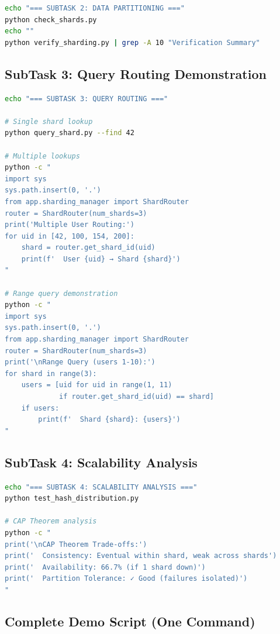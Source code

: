 \documentclass[11pt,a4paper]{article}
\begin{document}
\begin{lstlisting}[language=bash]
echo "=== SUBTASK 2: DATA PARTITIONING ==="
python check_shards.py
echo ""
python verify_sharding.py | grep -A 10 "Verification Summary"
\end{lstlisting}

\subsection*{SubTask 3: Query Routing Demonstration}

\begin{lstlisting}[language=bash]
echo "=== SUBTASK 3: QUERY ROUTING ==="

# Single shard lookup
python query_shard.py --find 42

# Multiple lookups
python -c "
import sys
sys.path.insert(0, '.')
from app.sharding_manager import ShardRouter
router = ShardRouter(num_shards=3)
print('Multiple User Routing:')
for uid in [42, 100, 154, 200]:
    shard = router.get_shard_id(uid)
    print(f'  User {uid} → Shard {shard}')
"

# Range query demonstration
python -c "
import sys
sys.path.insert(0, '.')
from app.sharding_manager import ShardRouter
router = ShardRouter(num_shards=3)
print('\nRange Query (users 1-10):')
for shard in range(3):
    users = [uid for uid in range(1, 11) 
             if router.get_shard_id(uid) == shard]
    if users:
        print(f'  Shard {shard}: {users}')
"
\end{lstlisting}

\subsection*{SubTask 4: Scalability Analysis}

\begin{lstlisting}[language=bash]
echo "=== SUBTASK 4: SCALABILITY ANALYSIS ==="
python test_hash_distribution.py

# CAP Theorem analysis
python -c "
print('\nCAP Theorem Trade-offs:')
print('  Consistency: Eventual within shard, weak across shards')
print('  Availability: 66.7% (if 1 shard down)')
print('  Partition Tolerance: ✓ Good (failures isolated)')
"
\end{lstlisting}

\subsection*{Complete Demo Script (One Command)}
\end{document}
